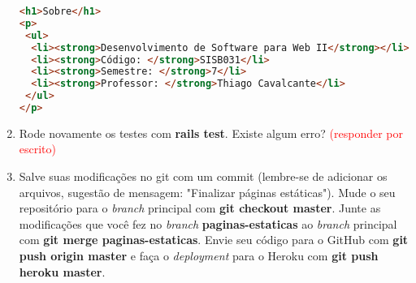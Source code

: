 \documentclass[a4paper,12pt]{article}
\begin{document}
\begin{enumerate}
  \pagebreak

  \begin{lstlisting}[language=html, title=app/views/paginas\_estaticas/sobre.html.erb, basicstyle=\scriptsize]
<h1>Sobre</h1>
<p>
 <ul>
  <li><strong>Desenvolvimento de Software para Web II</strong></li>
  <li><strong>Código: </strong>SISB031</li>
  <li><strong>Semestre: </strong>7</li>
  <li><strong>Professor: </strong>Thiago Cavalcante</li>
 </ul>
</p>
  \end{lstlisting}

  \item Rode novamente os testes com \textbf{rails test}. Existe algum erro? \textcolor{red}{(responder por escrito)}
  \item Salve suas modificações no git com um commit (lembre-se de adicionar os arquivos, sugestão de mensagem: "Finalizar páginas estáticas"). Mude o seu repositório para o \textit{branch} principal com \textbf{git checkout master}. Junte as modificações que você fez no \textit{branch} \textbf{paginas-estaticas} ao \textit{branch} principal com \textbf{git merge paginas-estaticas}. Envie seu código para o GitHub com \textbf{git push origin master} e faça o \textit{deployment} para o Heroku com \textbf{git push heroku master}.
\end{enumerate}
\end{document}
